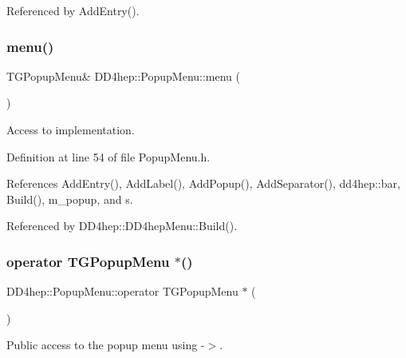 Referenced by Add\+Entry().

\hypertarget{class_d_d4hep_1_1_popup_menu_a3142e910b19e33ac04e9e260cb8981be}{}\label{class_d_d4hep_1_1_popup_menu_a3142e910b19e33ac04e9e260cb8981be} 
\subsubsection{\texorpdfstring{menu()}{menu()}}
{\footnotesize\ttfamily T\+G\+Popup\+Menu\& D\+D4hep\+::\+Popup\+Menu\+::menu (\begin{DoxyParamCaption}{ }\end{DoxyParamCaption})\hspace{0.3cm}{\ttfamily [inline]}}



Access to implementation. 



Definition at line 54 of file Popup\+Menu.\+h.



References Add\+Entry(), Add\+Label(), Add\+Popup(), Add\+Separator(), dd4hep\+::bar, Build(), m\+\_\+popup, and s.



Referenced by D\+D4hep\+::\+D\+D4hep\+Menu\+::\+Build().

\hypertarget{class_d_d4hep_1_1_popup_menu_a979ec84020ea83105d4bfc6c5c5b8fe8}{}\label{class_d_d4hep_1_1_popup_menu_a979ec84020ea83105d4bfc6c5c5b8fe8} 
\subsubsection{\texorpdfstring{operator T\+G\+Popup\+Menu $\ast$()}{operator TGPopupMenu *()}}
{\footnotesize\ttfamily D\+D4hep\+::\+Popup\+Menu\+::operator T\+G\+Popup\+Menu $\ast$ (\begin{DoxyParamCaption}{ }\end{DoxyParamCaption})\hspace{0.3cm}{\ttfamily [inline]}}



Public access to the popup menu using \textquotesingle{}-\/$>$\textquotesingle{}. 



